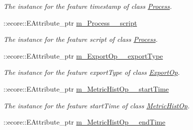 \begin{DoxyCompactItemize}
\begin{DoxyCompactList}\small\item\em The instance for the feature timestamp of class \hyperlink{classIMS__Data_1_1Process}{Process}. \item\end{DoxyCompactList}\item 
\hypertarget{classIMS__Data_1_1IMS__DataPackage_ac7edd54a44b192f831b95411aa89b86c}{
::ecore::EAttribute\_\-ptr \hyperlink{classIMS__Data_1_1IMS__DataPackage_ac7edd54a44b192f831b95411aa89b86c}{m\_\-Process\_\-\_\-script}}
\label{classIMS__Data_1_1IMS__DataPackage_ac7edd54a44b192f831b95411aa89b86c}

\begin{DoxyCompactList}\small\item\em The instance for the feature script of class \hyperlink{classIMS__Data_1_1Process}{Process}. \item\end{DoxyCompactList}\item 
\hypertarget{classIMS__Data_1_1IMS__DataPackage_a518b23cc8adbbf9ec5628e97968409a5}{
::ecore::EAttribute\_\-ptr \hyperlink{classIMS__Data_1_1IMS__DataPackage_a518b23cc8adbbf9ec5628e97968409a5}{m\_\-ExportOp\_\-\_\-exportType}}
\label{classIMS__Data_1_1IMS__DataPackage_a518b23cc8adbbf9ec5628e97968409a5}

\begin{DoxyCompactList}\small\item\em The instance for the feature exportType of class \hyperlink{classIMS__Data_1_1ExportOp}{ExportOp}. \item\end{DoxyCompactList}\item 
\hypertarget{classIMS__Data_1_1IMS__DataPackage_a33a0480dd135932c5f2f7d4f4eb04511}{
::ecore::EAttribute\_\-ptr \hyperlink{classIMS__Data_1_1IMS__DataPackage_a33a0480dd135932c5f2f7d4f4eb04511}{m\_\-MetricHistOp\_\-\_\-startTime}}
\label{classIMS__Data_1_1IMS__DataPackage_a33a0480dd135932c5f2f7d4f4eb04511}

\begin{DoxyCompactList}\small\item\em The instance for the feature startTime of class \hyperlink{classIMS__Data_1_1MetricHistOp}{MetricHistOp}. \item\end{DoxyCompactList}\item 
\hypertarget{classIMS__Data_1_1IMS__DataPackage_a66e86d5150fd757929331550505777d5}{
::ecore::EAttribute\_\-ptr \hyperlink{classIMS__Data_1_1IMS__DataPackage_a66e86d5150fd757929331550505777d5}{m\_\-MetricHistOp\_\-\_\-endTime}}
\label{classIMS__Data_1_1IMS__DataPackage_a66e86d5150fd757929331550505777d5}


\end{DoxyCompactItemize}
